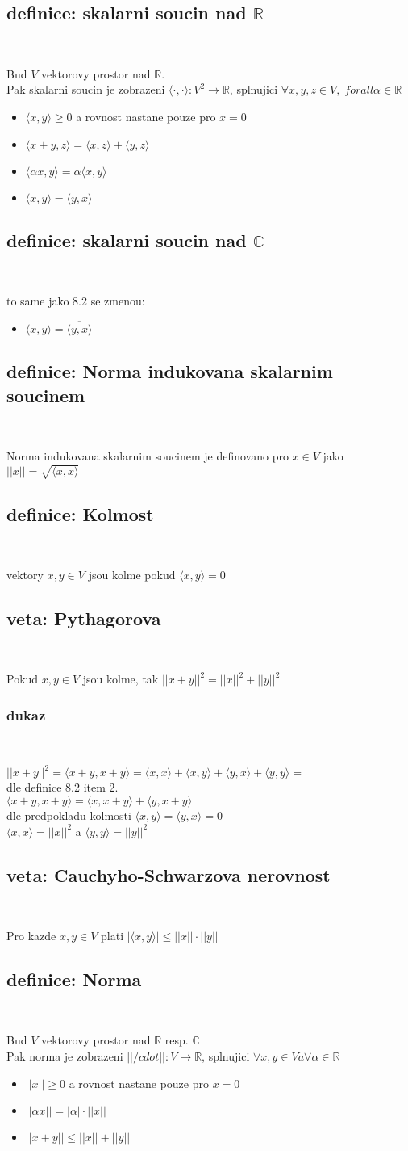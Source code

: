 \documentclass[a4paper]{article}
\newcommand{\definice}[3]{
	\setcounter{section}{#1}
	\setcounter{subsection}{#2}
	\addtocounter{subsection}{-1}
	\subsection{definice: #3}~
}
\newcommand{\veta}[3]{
	\setcounter{section}{#1}
	\setcounter{subsection}{#2}
	\addtocounter{subsection}{-1}
	\subsection{veta: #3}~
}
\newcommand{\dukaz}{
	\subsubsection*{dukaz}~
}
\begin{document}

\definice{8}{2}{skalarni soucin nad $\mathbb{R}$}
Bud $V$ vektorovy prostor nad $\mathbb{R}$.\\
Pak skalarni soucin je zobrazeni $\langle\cdot , \cdot\rangle:V^2 \rightarrow \mathbb{R}$,
splnujici $\forall x, y, z \in V, |forall \alpha \in \mathbb{R}$\\
\begin{itemize}
    \item $\langle x, y\rangle \geq 0$ a rovnost nastane pouze pro $x=0$
    \item $\langle x+y,z\rangle = \langle x,z\rangle + \langle y,z\rangle$
    \item $\langle\alpha x, y\rangle = \alpha\langle x,y\rangle$
    \item $\langle x,y\rangle = \langle y,x\rangle$
\end{itemize}


\definice{8}{3}{skalarni soucin nad $\mathbb{C}$}
to same jako 8.2 se zmenou:\\
\begin{itemize}
    \item $\langle x,y\rangle = \overline{\langle y,x\rangle}$
\end{itemize}


\definice{8}{8}{Norma indukovana skalarnim soucinem}
Norma indukovana skalarnim soucinem je definovano pro
$x\in V$ jako $ ||x|| = \sqrt{\langle x,x\rangle} $

\definice{8}{9}{Kolmost}
vektory $x,y \in V$ jsou kolme pokud $\langle x, y \rangle = 0$


\veta{8}{11}{Pythagorova}
Pokud $x,y \in V$ jsou kolme, tak $||x+y||^2 = ||x||^2+||y||^2$

\dukaz
$||x+y||^2=\langle x+y, x+y\rangle=\langle x,x\rangle+\langle x,y\rangle+\langle y,x\rangle+\langle y,y\rangle=$\\
dle definice 8.2 item 2.\\
$\langle x+y, x+y\rangle=\langle x,x+y\rangle+\langle y,x+y\rangle$\\
dle predpokladu kolmosti $\langle x,y\rangle = \langle y,x\rangle = 0$\\
$\langle x,x\rangle = ||x||^2$ a $\langle y,y\rangle = ||y||^2$


\veta{8}{13}{Cauchyho-Schwarzova nerovnost}
Pro kazde $x,y \in V$ plati $|\langle x,y\rangle| \leq ||x||\cdot||y||$


\definice{8}{15}{Norma}
Bud $V$ vektorovy prostor nad $\mathbb{R}$ resp. $\mathbb{C}$\\
Pak norma je zobrazeni $||/cdot|| : V \rightarrow \mathbb{R}$,
splnujici $\forall x, y \in V a \forall \alpha \in \mathbb{R}$\\
\begin{itemize}
    \item $||x|| \geq 0$ a rovnost nastane pouze pro $x=0$
    \item $||\alpha x || = |\alpha|\cdot ||x||$
    \item $||x+y|| \leq ||x|| + ||y||$
\end{itemize}
\end{document}
